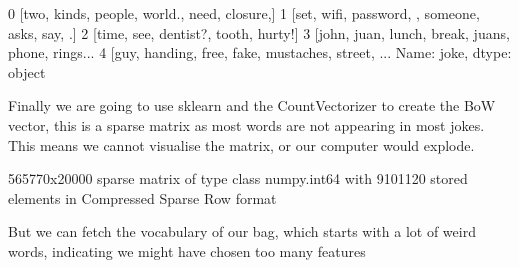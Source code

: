 \documentclass[letterpaper,10pt,english]{jupyterBook}
\begin{document}
\begin{sphinxVerbatim}[commandchars=\\\{\}]
0         [two, kinds, people, world., need, closure,]
1       [set, wifi, password, , someone, asks, say, .]
2                 [time, see, dentist?, tooth, hurty!]
3    [john, juan, lunch, break, juans, phone, rings...
4    [guy, handing, free, fake, mustaches, street, ...
Name: joke, dtype: object
\end{sphinxVerbatim}

\sphinxAtStartPar
Finally we are going to use sklearn and the CountVectorizer to create the BoW vector, this is a sparse matrix as most words are not appearing in most jokes.
This means we cannot visualise the matrix, or our computer would explode.

\begin{sphinxVerbatim}[commandchars=\\\{\}]
   

     

  
\end{sphinxVerbatim}

\begin{sphinxVerbatim}[commandchars=\\\{\}]
\end{sphinxVerbatim}

\begin{sphinxVerbatim}[commandchars=\\\{\}]
\PYGZlt{}565770x20000 sparse matrix of type \PYGZsq{}\PYGZlt{}class \PYGZsq{}numpy.int64\PYGZsq{}\PYGZgt{}\PYGZsq{}
	with 9101120 stored elements in Compressed Sparse Row format\PYGZgt{}
\end{sphinxVerbatim}

\sphinxAtStartPar
But we can fetch the vocabulary of our bag, which starts with a lot of weird words, indicating we might have chosen too many features
\end{document}
